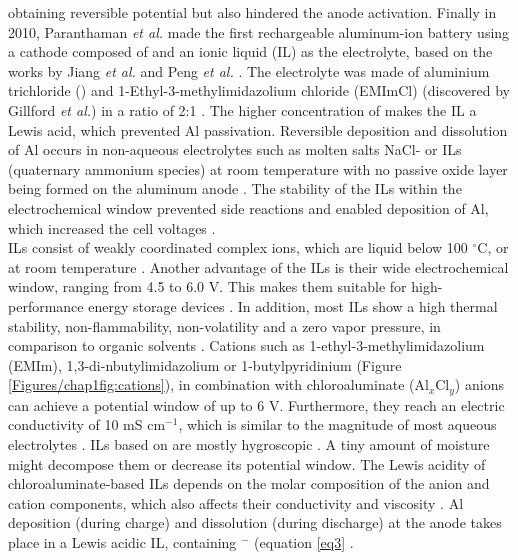 obtaining reversible potential but also hindered the anode activation. Finally in 2010, Paranthaman \textit{et al.} made the first rechargeable aluminum-ion battery using a cathode composed of  and an ionic liquid (IL) as the electrolyte, based on the works by Jiang \textit{et al.} and Peng \textit{et al.} \cite{paranthaman_transformational_2010, jiang_electrodeposition_2006,peng_investigation_2008}. 
The electrolyte was made of aluminium trichloride () and 1-Ethyl-3-methylimidazolium chloride (EMImCl) (discovered by Gillford \textit{et al.}) in a ratio of 2:1 \cite{gifford_aluminum/chlorine_1988}. The higher concentration of  makes the IL a Lewis acid, which prevented Al passivation. 
Reversible deposition and dissolution of Al occurs in non-aqueous electrolytes such as molten salts NaCl- or ILs (quaternary ammonium species) at room temperature with no passive oxide layer being formed on the aluminum anode \cite{vestergaard_molten_1993,galinski_ionic_2006,elia_insights_2017}. The stability of the ILs within the electrochemical window prevented side reactions and enabled deposition of Al, which increased the cell voltages \cite{li_aluminum_2002}.\\ ILs consist of weakly coordinated complex ions, which are liquid below 100 $^{\circ}$C, or at room temperature \cite{hayes_structure_2015}. Another advantage of the ILs is their wide electrochemical window, ranging from 4.5 to 6.0 V. This makes them suitable for high-performance energy storage devices \cite{wang_binder-free_2015}. In addition, most ILs show a high thermal stability, non-flammability, non-volatility and a zero vapor pressure, in comparison to organic solvents \cite{dieter}. Cations such as 1-ethyl-3-methylimidazolium (EMIm), 1,3-di-nbutylimidazolium or 1-butylpyridinium (Figure \ref{Figures/chap1fig:cations}), in combination with chloroaluminate (Al$_x$Cl$_y$) anions can achieve a potential window of up to 6 V. Furthermore, they reach an electric conductivity of 10 mS cm$^{-1}$, which is similar to the magnitude of most aqueous electrolytes \cite{ngo_thermal_2000}. ILs based on  are mostly hygroscopic \cite{ueda_electroplating_2012}. A tiny amount of moisture might decompose them or decrease its potential window. The Lewis acidity of chloroaluminate-based ILs depends on the molar composition of the anion and cation components, which also affects their conductivity and viscosity \cite{buzzeo_non-haloaluminate_2004}. 
Al deposition (during charge) and dissolution (during discharge) at the anode takes place in a Lewis acidic IL, containing $^-$ (equation \ref{eq3} \cite{galinski_ionic_2006}.

